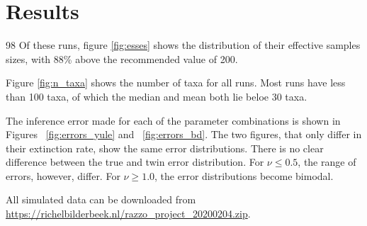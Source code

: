 \section{Results}

98%
Of these runs, figure \ref{fig:esses} shows the distribution 
of their effective samples sizes, with 88\% above the recommended 
value of 200. 

Figure \ref{fig:n_taxa} shows the number of taxa for all runs. 
Most runs have less than 100 taxa, of which the median and mean both lie
beloe 30 taxa.

The inference error made for each of the parameter combinations
is shown in Figures ~\ref{fig:errors_yule} and ~\ref{fig:errors_bd}.
The two figures, that only differ in their extinction rate, 
show the same error distributions. There is no clear difference between
the true and twin error distribution. For $\nu \leqslant 0.5$, the
range of errors, however, differ. For $\nu \geq 1.0$, the error
distributions become bimodal. 

All simulated data can be downloaded from \url{https://richelbilderbeek.nl/razzo_project_20200204.zip}.

